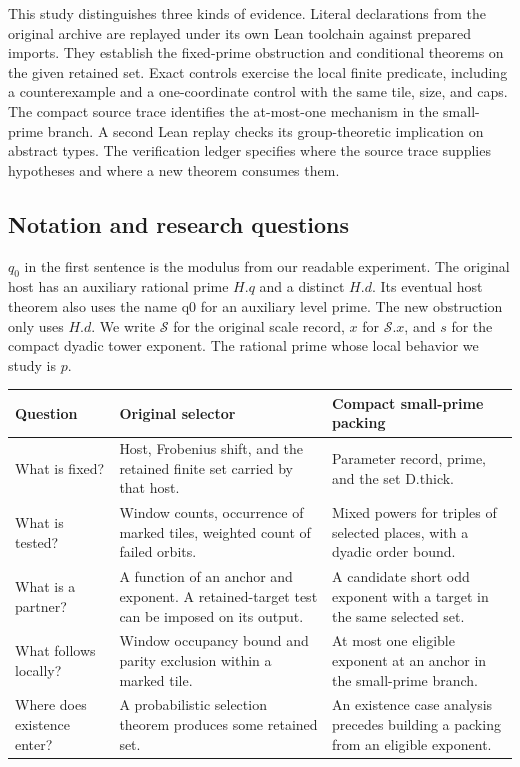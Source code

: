 \documentclass[12pt,letterpaper]{article}
\DeclareRobustCommand{\id}[1]{\mbox{\small\ttfamily #1}}
\begin{document}
This study distinguishes three kinds of evidence. Literal declarations from the original archive are replayed under its own Lean toolchain against prepared imports. They establish the fixed-prime obstruction and conditional theorems on the given retained set. Exact controls exercise the local finite predicate, including a counterexample and a one-coordinate control with the same tile, size, and caps. The compact source trace identifies the at-most-one mechanism in the small-prime branch. A second Lean replay checks its group-theoretic implication on abstract types. The verification ledger specifies where the source trace supplies hypotheses and where a new theorem consumes them.

\subsection{Notation and research questions}

$q_0$ in the first sentence is the modulus from our readable experiment. The original host has an auxiliary rational prime $H.q$ and a distinct $H.d$. Its eventual host theorem also uses the name \id{q0} for an auxiliary level prime. The new obstruction only uses $H.d$. We write $\mathcal S$ for the original scale record, $x$ for $\mathcal S.x$, and $s$ for the compact dyadic tower exponent. The rational prime whose local behavior we study is $p$.

\begin{center}
\begin{tabularx}{\linewidth}{@{}p{.22\linewidth}Y Y@{}}
\toprule
Question & Original selector & Compact small-prime packing\\
\midrule
What is fixed? & Host, Frobenius shift, and the retained finite set carried by that host. & Parameter record, prime, and the set \id{D.thick}.\\
What is tested? & Window counts, occurrence of marked tiles, weighted count of failed orbits. & Mixed powers for triples of selected places, with a dyadic order bound.\\
What is a partner? & A function of an anchor and exponent. A retained-target test can be imposed on its output. & A candidate short odd exponent with a target in the same selected set.\\
What follows locally? & Window occupancy bound and parity exclusion within a marked tile. & At most one eligible exponent at an anchor in the small-prime branch.\\
Where does existence enter? & A probabilistic selection theorem produces some retained set. & An existence case analysis precedes building a packing from an eligible exponent.\\
\bottomrule
\end{tabularx}
\end{center}
\end{document}
